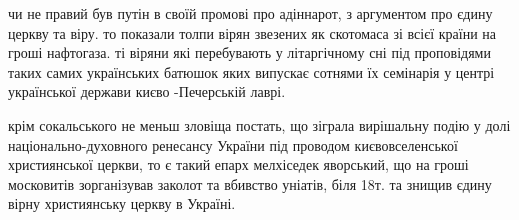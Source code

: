 \begin{itemize}
чи не правий був путін в своїй промові про адіннарот, з аргументом про єдину
церкву та віру. то показали толпи вірян звезених як скотомаса зі всієї країни
на гроші нафтогаза. ті віряни які перебувають у літаргічному сні під
проповідями таких самих українських батюшок яких випускає сотнями їх семінарія
у центрі української держави києво -Печерській лаврі.


 
крім сокальського не меньш зловіща постать, що зіграла вирішальну подію у долі
національно-духовного ренесансу України під проводом києвовселенської
християнської церкви, то є такий епарх мелхіседек яворський, що на гроші
московитів зорганізував заколот та вбивство уніатів, біля 18т. та знищив єдину
вірну християнську церкву в Україні.

\end{itemize}

